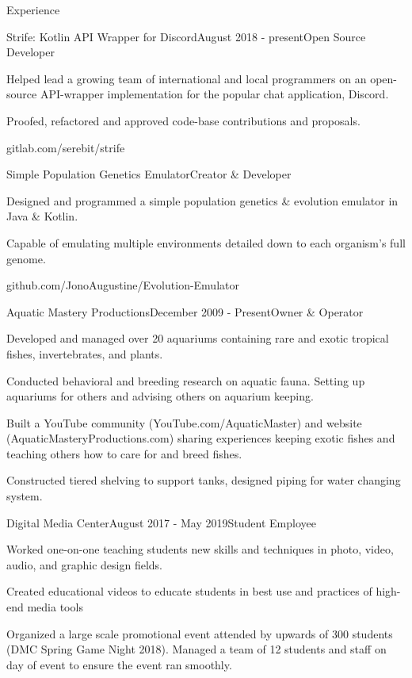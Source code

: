 \documentclass{resume} %
\begin{document}
\begin{rSection}{Experience}

\begin{rSubsection}{Strife: Kotlin API Wrapper for Discord}{August 2018 - present}{Open Source Developer}{}
\item Helped lead a growing team of international and local programmers on an open-source API-wrapper 
implementation for the popular chat application, Discord.
\item Proofed, refactored and approved code-base contributions and proposals.
\item gitlab.com/serebit/strife
\end{rSubsection}



\begin{rSubsection}{Simple Population Genetics Emulator}{}{Creator \&  Developer}{}
\item Designed and programmed a simple population genetics & evolution emulator in Java \& Kotlin.
\item Capable of emulating multiple environments detailed down to each organism’s full genome.
\item github.com/JonoAugustine/Evolution-Emulator
\end{rSubsection}



\begin{rSubsection}{Aquatic Mastery Productions}{December 2009 - Present}{Owner \& Operator}{}
\item Developed and managed over 20 aquariums containing rare and exotic tropical fishes, invertebrates, and plants.
\item Conducted behavioral and breeding research on aquatic fauna. Setting up aquariums for others and advising others on aquarium keeping.
\item Built a YouTube community (YouTube.com/AquaticMaster) and website (AquaticMasteryProductions.com) sharing experiences keeping exotic fishes and teaching others how to care for and breed fishes.
\item Constructed tiered shelving to support tanks, designed piping for water changing system.
\end{rSubsection}


\begin{rSubsection}{Digital Media Center}{August 2017 - May 2019}{Student Employee}{}
\item Worked one-on-one teaching students new skills and techniques in photo, video, audio, and graphic design fields.
\item Created educational videos to educate students in best use and practices of  high-end media tools
\item Organized a large scale promotional event attended by upwards of 300 students (DMC Spring Game Night 2018). Managed a team of 12 students and staff on day of event to ensure the event ran smoothly.



\end{rSubsection}
\end{rSection}
\end{document}
